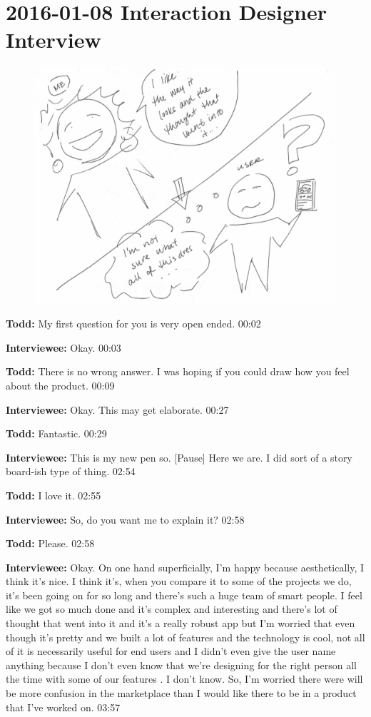 \section{2016-01-08 Interaction Designer Interview}

\begin{figure}[h]
\centering
\includegraphics[width=6.5in]{interviews/drawings/2016_01_08.png}
\caption{}
\label{2016_01_08}
\end{figure}

\textbf{Todd:} My first question for you is very open ended.  00:02

\textbf{Interviewee:} Okay.  00:03

\textbf{Todd:} There is no wrong answer.  I was hoping if you could draw how you feel about the product.  00:09

\textbf{Interviewee:} Okay.  This may get elaborate.  00:27

\textbf{Todd:} Fantastic.  00:29

\textbf{Interviewee:} This is my new pen so.  [Pause] Here we are.  I did sort of a story board-ish type of thing.  02:54

\textbf{Todd:} I love it.  02:55

\textbf{Interviewee:} So, do you want me to explain it?  02:58

\textbf{Todd:} Please.  02:58

\textbf{Interviewee:} Okay.  On one hand superficially, I'm happy because aesthetically, I think it's nice.  I think it's, when you compare it to some of the projects we do, it's been going on for so long and there's such a huge team of smart people.  I feel like we got so much done and it's complex and interesting and there's lot of thought that went into it and it's a really robust app but I'm worried that even though it's pretty and we built a lot of features and the technology is cool, not all of it is necessarily useful for end users and I didn't even give the user name anything because I don't even know that we're designing for the right person all the time with some of our features .  I don't know.  So, I'm worried there were will be more confusion in the marketplace than I would like there to be in a product that I've worked on.  03:57

